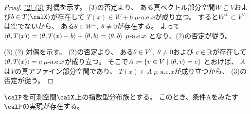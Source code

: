\documentclass[report]{jlreq}
\begin{document}
\begin{proof}
    \uline{(2) \Rightarrow (3)} \quad
    対偶を示す。
    (3)の否定より、
    ある真ベクトル部分空間$W \subsetneq V$および$b \in T(\calX)$が存在して
    $T(x) \in W + b \; \text{$\mu$-a.e.$x$}$が成り立つ。
    すると$W^\perp \subset V^\vee$は空でないから、
    ある$\theta \in W^\perp, \; \theta \neq 0$が存在する。
    よって
    $\left\langle{\theta},{T(x)}\right\rangle
        = \left\langle{\theta},{T(x) - b}\right\rangle
        + \left\langle{\theta},{b}\right\rangle
        = \left\langle{\theta},{b}\right\rangle \; \text{$\mu$-a.e.$x$}$
    となり、(2)の否定が従う。

    \uline{(3) \Rightarrow (2)} \quad
    対偶を示す。
    (2)の否定より、
    ある$\theta \in V^\vee, \; \theta \neq 0$および
    $c \in \mathbb{R}$が存在して
    $\left\langle{\theta},{T(x)}\right\rangle = c \; \text{$\mu$-a.e.$x$}$が成り立つ。
    そこで$A \coloneqq \left\{{
        v \in V
        \mid
        \left\langle{\theta},{v}\right\rangle = c
    }\right\}$
    とおけば、
    $A$は$V$の真アファイン部分空間であり、
    $T(x) \in A \; \text{$\mu$-a.e.$x$}$が成り立つから、
    (3)の否定が従う。
\end{proof}

\begin{theorem}[条件Aをみたす実現の存在]
    $\calP$を可測空間$\calX$上の指数型分布族とする。
    このとき、条件Aをみたす$\calP$の実現が存在する。
\end{theorem}
\end{document}
